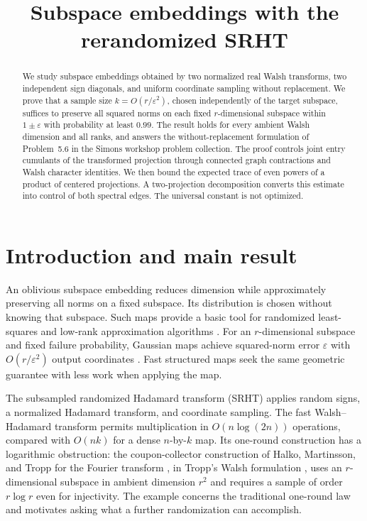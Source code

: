 \documentclass[11pt]{article}
\title{Subspace embeddings with the rerandomized SRHT}
\author{}
\date{}
\theoremstyle{definition}
\theoremstyle{remark}
\theoremstyle{plain}
\begin{document}
\maketitle

\begin{abstract}
We study subspace embeddings obtained by two normalized real Walsh
transforms, two independent sign diagonals, and uniform coordinate
sampling without replacement. We prove that a sample size
$k=O(r/\varepsilon^2)$, chosen independently of the target subspace,
suffices to preserve all squared norms on each fixed $r$-dimensional
subspace within $1\pm\varepsilon$ with probability at least $0.99$.
The result holds for every ambient Walsh dimension and all ranks,
and answers the without-replacement formulation of Problem~5.6 in
the Simons workshop problem collection.
The proof controls joint entry cumulants of the transformed projection
through connected graph contractions and Walsh character identities.
We then bound the expected trace of even powers of a product of
centered projections. A two-projection decomposition converts this
estimate into control of both spectral edges.
The universal constant is not optimized.
\end{abstract}

\section{Introduction and main result}\label{sec:introduction}

An oblivious subspace embedding reduces dimension while approximately
preserving all norms on a fixed subspace. Its distribution is chosen
without knowing that subspace. Such maps provide a basic tool for
randomized least-squares and low-rank approximation algorithms
\cite{hmt,boutsidis_gittens}. For an $r$-dimensional subspace and fixed
failure probability, Gaussian maps achieve squared-norm error
$\varepsilon$ with $O(r/\varepsilon^2)$ output coordinates
\cite[Section~1]{nelson_nguyen}.
Fast structured maps seek the same geometric guarantee with less
work when applying the map.

The subsampled randomized Hadamard transform (SRHT) applies random
signs, a normalized Hadamard transform, and coordinate sampling.
The fast Walsh--Hadamard transform permits multiplication in
$O(n\log(2n))$ operations, compared with $O(nk)$ for a dense
$n$-by-$k$ map. Its one-round construction has a logarithmic
obstruction: the coupon-collector construction of
Halko, Martinsson, and Tropp for the Fourier transform
\cite[Remark~11.2]{hmt}, in Tropp's Walsh formulation
\cite[Section~3.3]{tropp_srht}, uses an $r$-dimensional subspace in ambient dimension $r^2$
and requires a sample of order $r\log r$ even for injectivity.
The example concerns the traditional one-round law and motivates
asking what a further randomization can accomplish.
\end{document}
